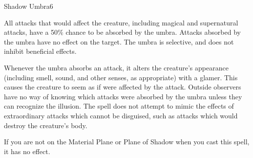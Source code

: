 \begin{spellsection}{Shadow Umbra}{6}
    \begin{spellheader}
    \end{spellheader}
    \begin{spellcontent}
        \begin{spelltargetinginfo}
        \end{spelltargetinginfo}
        \begin{spelleffects}
            \spelleffect All attacks that would affect the creature, including magical and supernatural attacks, have a 50\% chance to be absorbed by the umbra. Attacks absorbed by the umbra have no effect on the target. The umbra is selective, and does not inhibit beneficial effects.

            Whenever the umbra absorbs an attack, it alters the creature's appearance (including smell, sound, and other senses, as appropriate) with a glamer. This causes the creature to seem as if were affected by the attack. Outside observers have no way of knowing which attacks were absorbed by the umbra unless they can recognize the illusion. The spell does not attempt to mimic the effects of extraordinary attacks which cannot be disguised, such as attacks which would destroy the creature's body.
            \spelldur \durshort
        \end{spelleffects}
    \end{spellcontent}
    \begin{spellfooter}
        \spellnotes If you are not on the Material Plane or Plane of Shadow when you cast this spell, it has no effect.
        \miscastrandom
    \end{spellfooter}
\end{spellsection}

